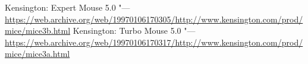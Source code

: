 \documentclass[11pt, a4paper]{article}
\begin{document}
\begin{thebibliography}{9}

 Kensington: Expert Mouse 5.0 "--- \url{https://web.archive.org/web/19970106170305/http://www.kensington.com/prod/mice/mice3b.html}
 Kensington: Turbo Mouse 5.0 "--- \url{https://web.archive.org/web/19970106170317/http://www.kensington.com/prod/mice/mice3a.html}
\end{thebibliography}
\end{document}
